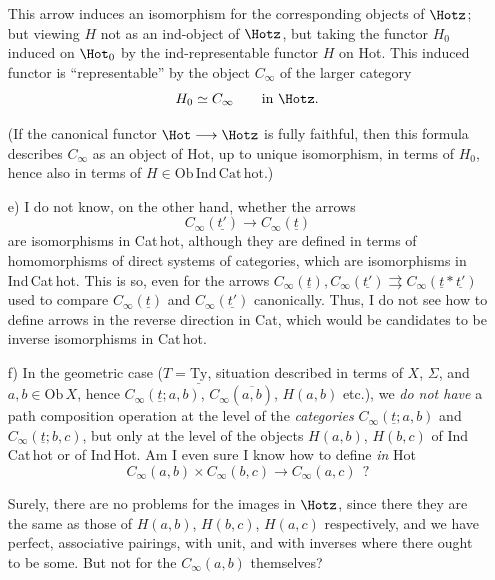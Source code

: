 \begin{enumerate}
This arrow induces an isomorphism for the corresponding objects of $\Hotz$; but viewing $H$ not as an ind-object of $\Hotz$, but taking the functor $H_0$ induced on $\Hot_0$ by the ind-representable functor $H$ on Hot. This induced functor is ``representable'' by the object $C_\infty$ of the larger category
\[
H_0 \simeq C_\infty \qquad \text{in } \Hotz.
\]

(If the canonical functor $\Hot \longrightarrow \Hotz$ is fully faithful, then this formula describes $C_\infty$ as an object of Hot, up to unique isomorphism, in terms of $H_0$, hence also in terms of $H \in \mathrm{Ob\,Ind\,Cat\,hot}$.)

\item[e)] I do not know, on the other hand, whether the arrows
\[
C_\infty(\underline{t'}) \longrightarrow C_\infty(\underline{t})
\]
are isomorphisms in Cat\,hot, although they are defined in terms of homomorphisms of direct systems of categories, which are isomorphisms in Ind\,Cat\,hot. This is so, even for the arrows $C_\infty(\underline{t}), C_\infty(\underline{t'}) \rightrightarrows C_\infty(\underline{t} * \underline{t'})$ used to compare $C_\infty(\underline{t})$ and $C_\infty(\underline{t'})$ canonically. Thus, I do not see how to define arrows in the reverse direction in Cat, which would be candidates to be inverse isomorphisms in Cat\,hot.

\item[f)] In the geometric case ($T = \underline{\mathrm{Ty}}$, situation described in terms of $X$, $\Sigma$, and $a, b \in \mathrm{Ob}\,X$, hence $C_\infty(\underline{t}; a, b)$, $C_\infty(\overline{a, b})$, $H(a,b)$ etc.), we \textit{do not have} a path composition operation at the level of the \textit{categories} $C_\infty(\underline{t}; a, b)$ and $C_\infty(\underline{t}; b, c)$, but only at the level of the objects $H(a,b)$, $H(b,c)$ of Ind\,Cat\,hot or of Ind\,Hot. Am I even sure I know how to define \textit{in} Hot
\[
C_\infty(a,b) \times C_\infty(b,c) \longrightarrow C_\infty(a,c) \ \ ?
\]

Surely, there are no problems for the images in $\Hotz$, since there they are the same as those of $H(a,b)$, $H(b,c)$, $H(a,c)$ respectively, and we have perfect, associative pairings, with unit, and with inverses where there ought to %
be some. But not for the $C_\infty(a,b)$ themselves?
\end{enumerate}


